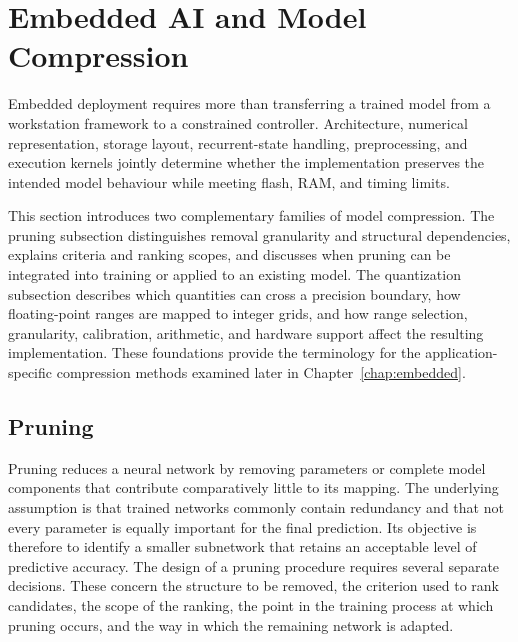 \documentclass[
    a4paper,
    12pt,
    titlepage,
    bibliography=totoc,
    twoside=on,
    parskip=false,
    numbers=noenddot,
    cleardoublepage=empty,
    DIV=12,
    BCOR=12.0mm,
    headheight=36pt,
    headings=openright
]{scrreprt}
\begin{document}
\section{Embedded AI and Model Compression}
Embedded deployment requires more than transferring a trained model from a workstation framework to a constrained controller. Architecture, numerical representation, storage layout, recurrent-state handling, preprocessing, and execution kernels jointly determine whether the implementation preserves the intended model behaviour while meeting flash, RAM, and timing limits.\autocite{cordova-cardenasEdgeAIPractice2025,linTinyMachineLearning2023,naguibMicroprocessorExecutionTime2022}

This section introduces two complementary families of model compression. The pruning subsection distinguishes removal granularity and structural dependencies, explains criteria and ranking scopes, and discusses when pruning can be integrated into training or applied to an existing model. The quantization subsection describes which quantities can cross a precision boundary, how floating-point ranges are mapped to integer grids, and how range selection, granularity, calibration, arithmetic, and hardware support affect the resulting implementation. These foundations provide the terminology for the application-specific compression methods examined later in Chapter~\ref{chap:embedded}.

\subsection{Pruning}
\label{sec:fundamental_pruning}
Pruning reduces a neural network by removing parameters or complete model components that contribute comparatively little to its mapping. The underlying assumption is that trained networks commonly contain redundancy and that not every parameter is equally important for the final prediction. Its objective is therefore to identify a smaller subnetwork that retains an acceptable level of predictive accuracy. The design of a pruning procedure requires several separate decisions. These concern the structure to be removed, the criterion used to rank candidates, the scope of the ranking, the point in the training process at which pruning occurs, and the way in which the remaining network is adapted.\autocite{blalockWhatStateNeural2020,chengSurveyDeepNeural2024,heStructuredPruningSurvey2024}
\end{document}

